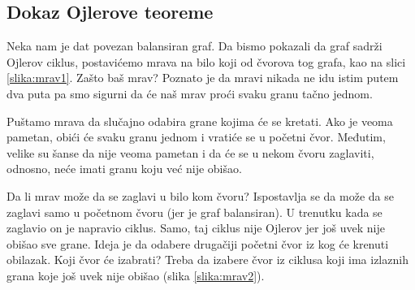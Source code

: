 \subsection{Dokaz Ojlerove teoreme}

Neka nam je dat povezan balansiran graf. Da bismo pokazali da graf sadrži Ojlerov ciklus, postavićemo mrava na bilo koji od čvorova tog grafa, kao na slici \ref{slika:mrav1}. Zašto baš mrav? Poznato je da mravi nikada ne idu istim putem dva puta pa smo sigurni da će naš mrav proći svaku granu tačno jednom.

Puštamo mrava da slučajno odabira grane kojima će se kretati. Ako je veoma pametan, obići će svaku granu jednom i vratiće se u početni čvor. Međutim, velike su šanse da nije veoma pametan i da će se u nekom čvoru zaglaviti, odnosno, neće imati granu koju već nije obišao.

Da li mrav može da se zaglavi u bilo kom čvoru? Ispostavlja se da može da se zaglavi samo u početnom čvoru (jer je graf balansiran). U trenutku kada se zaglavio on je napravio ciklus. Samo, taj ciklus nije Ojlerov jer još uvek nije obišao sve grane. Ideja je da odabere drugačiji početni čvor iz kog će krenuti obilazak. Koji čvor će izabrati? Treba da izabere čvor iz ciklusa koji ima izlaznih grana koje još uvek nije obišao (slika \ref{slika:mrav2}). 

